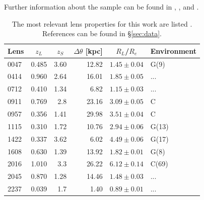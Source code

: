 \documentclass[useAMS,usenatbib]{mn2e}
\begin{document}
Further information about the sample can be found in \cite{leier11phd}, \cite{2011ApJ...740...97L}, and \cite{2012A&A...538A..99S}.

\begin{table}
  \begin{center}
    \begin{tabular}{l r r r r l}
      Lens    & \multicolumn{1}{c}{$z_{L}$} & \multicolumn{1}{c}{$z_{S}$} & \multicolumn{1}{c}{$\Delta\theta$ [kpc]} & \multicolumn{1}{c}{$R_{L}$/$R_{e}$} & Environment \\ \hline
      0047 & 0.485 & 3.60 & 12.82 & $1.45\pm0.04$ & G(9) \\
      0414 & 0.960 & 2.64 & 16.01 & $1.85\pm0.05$ & ... \\
      0712 & 0.410 & 1.34 & 6.82  & $1.15\pm0.03$ & ... \\
      0911 & 0.769 & 2.8  & 23.16 & $3.09\pm0.05$ & C \\
      0957 & 0.356 & 1.41 & 29.98 & $3.51\pm0.04$ & C \\
      1115 & 0.310 & 1.72 & 10.76 & $2.94\pm0.06$ & G(13) \\
      1422 & 0.337 & 3.62 & 6.02  & $4.49\pm0.06$ & G(17) \\
      1608 & 0.630 & 1.39 & 13.92 & $1.82\pm0.01$ & G(8) \\
      2016 & 1.010 & 3.3  & 26.22 & $6.12\pm0.14$ & C(69) \\
      2045 & 0.870 & 1.28 & 14.46 & $1.48\pm0.03$ & ... \\
      2237 & 0.039 & 1.7  & 1.40  & $0.89\pm0.01$ & ... \\
    \end{tabular}
    \caption[width=\linewidth]{The most relevant lens properties for this work are listed \citep[for an expanded version of this table see][]{2011ApJ...740...97L}. References can be found in \S\ref{sec:data}.}
    \label{tab:lensproperties}
  \end{center}
\end{table}
\end{document}

